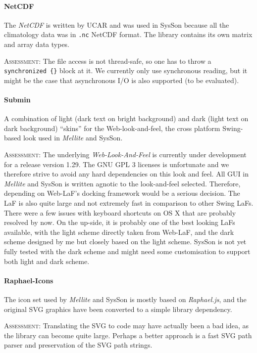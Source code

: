\documentclass[11pt,a4paper]{article}
\newcommand{\software}[1]{\textit{#1}}
\newcommand{\sysson}[0]{SysSon}
\newcommand{\assessment}[0]{\textsc{Assessment:}}
\begin{document}
\paragraph{NetCDF}

The \software{NetCDF} is written by UCAR and was used in \sysson{} because all the climatology data was in \verb!.nc! NetCDF format. The library contains its own matrix and array data types.

\assessment{} The file access is not thread-safe, so one has to throw a \verb!synchronized {}! block at it. We currently only use synchronous reading, but it might be the case that asynchronous I/O is also supported (to be evaluated).

\paragraph{Submin}

A combination of light (dark text on bright background) and dark (light text on dark background) ``skins'' for the Web-look-and-feel, the cross platform Swing-based look used in \software{Mellite} and \sysson{}.

\assessment{} The underlying \software{Web-Look-And-Feel} is currently under development for a release version 1.29. The GNU GPL 3 licenses is unfortunate and we therefore strive to avoid any hard dependencies on this look and feel. All GUI in \software{Mellite} and \sysson{} is written agnotic to the look-and-feel selected. Therefore, depending on Web-LaF's docking framework would be a serious decision. The LaF is also quite large and not extremely fast in comparison to other Swing LaFs. There were a few issues with keyboard shortcuts on OS X that are probably resolved by now. On the up-side, it is probably one of the best looking LaFs available, with the light scheme directly taken from Web-LaF, and the dark scheme designed by me but closely based on the light scheme. \sysson{} is not yet fully tested with the dark scheme and might need some customisation to support both light and dark scheme.

\paragraph{Raphael-Icons}

The icon set used by \software{Mellite} and \sysson{} is mostly based on \software{Raphael.js}, and the original SVG graphics have been converted to a simple library dependency.

\assessment{} Translating the SVG to code may have actually been a bad idea, as the library can become quite large. Perhaps a better approach is a fast SVG path parser and preservation of the SVG path strings.
\end{document}

